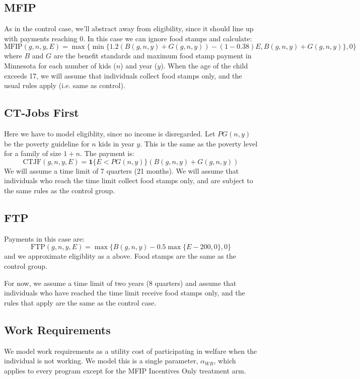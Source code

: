 \documentclass[12pt]{article}
\numberwithin{equation}{section}
\numberwithin{figure}{section}
\numberwithin{table}{section}
\begin{document}
\subsection{MFIP}
As in the control case, we'll abstract away from eligibility, since it should line up with payments reaching 0. In this case we can ignore food stamps and calculate:
\[\text{MFIP}(g,n,y,E) = \max\{\min\{1.2(B(g,n,y)+G(g,n,y)) - (1-0.38)E,B(g,n,y)+G(g,n,y)\},0\} \]
where $B$ and $G$ are the benefit standards and maximum food stamp payment in Minnesota for each number of kids ($n$) and year ($y$). When the age of the child exceeds 17, we will assume that individuals collect food stamps only, and the usual rules apply (i.e. same as control).

\subsection{CT-Jobs First}
Here we have to model eligiblity, since no income is disregarded. Let $PG(n,y)$ be the poverty guideline for $n$ kids in year $y$. This is the same as the poverty level for a family of size $1+n$. The payment is:
\[\text{CTJF}(g,n,y,E) = \mathbf{1}\{E<PG(n,y)\}(B(g,n,y)+G(g,n,y)) \]
We will assume a time limit of 7 quarters (21 months). We will assume that individuals who reach the time limit collect food stamps only, and are subject to the same rules as the control group.

\subsection{FTP}
Payments in this case are:
\[\text{FTP}(g,n,y,E) = \max\{B(g,n,y) - 0.5\max\{E-200,0\},0\} \]
and we approximate eligiblity as a above. Food stamps are the same as the control group.

For now, we assume a time limit of two years (8 quarters) and assume that individuals who have reached the time limit receive food stamps only, and the rules that apply are the same as the control case.

\subsection{Work Requirements}
We model work requirements as a utility cost of participating in welfare when the individual is not working. We model this is a single parameter, $\alpha_{WR}$, which applies to every program except for the MFIP Incentives Only treatment arm.

%


\end{document}
